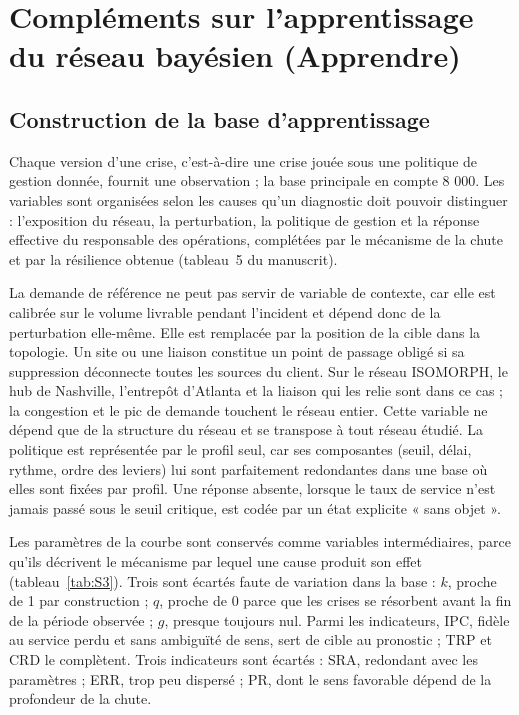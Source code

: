 \section{Compléments sur l'apprentissage du réseau bayésien (Apprendre)}
\label{sec:S5}

\subsection{Construction de la base d'apprentissage}
\label{sec:S5.1}

Chaque version d'une crise, c'est-à-dire une crise jouée sous une politique de gestion donnée, fournit une observation ; la base principale en compte 8 000. Les variables sont organisées selon les causes qu'un diagnostic doit pouvoir distinguer : l'exposition du réseau, la perturbation, la politique de gestion et la réponse effective du responsable des opérations, complétées par le mécanisme de la chute et par la résilience obtenue (tableau~5 du manuscrit).

La demande de référence ne peut pas servir de variable de contexte, car elle est calibrée sur le volume livrable pendant l'incident et dépend donc de la perturbation elle-même. Elle est remplacée par la position de la cible dans la topologie. Un site ou une liaison constitue un point de passage obligé si sa suppression déconnecte toutes les sources du client. Sur le réseau ISOMORPH, le hub de Nashville, l'entrepôt d'Atlanta et la liaison qui les relie sont dans ce cas ; la congestion et le pic de demande touchent le réseau entier. Cette variable ne dépend que de la structure du réseau et se transpose à tout réseau étudié. La politique est représentée par le profil seul, car ses composantes (seuil, délai, rythme, ordre des leviers) lui sont parfaitement redondantes dans une base où elles sont fixées par profil. Une réponse absente, lorsque le taux de service n'est jamais passé sous le seuil critique, est codée par un état explicite « sans objet ».

Les paramètres de la courbe sont conservés comme variables intermédiaires, parce qu'ils décrivent le mécanisme par lequel une cause produit son effet (tableau~\ref{tab:S3}). Trois sont écartés faute de variation dans la base : $k$, proche de 1 par construction ; $q$, proche de 0 parce que les crises se résorbent avant la fin de la période observée ; $g$, presque toujours nul. Parmi les indicateurs, IPC, fidèle au service perdu et sans ambiguïté de sens, sert de cible au pronostic ; TRP et CRD le complètent. Trois indicateurs sont écartés : SRA, redondant avec les paramètres ; ERR, trop peu dispersé ; PR, dont le sens favorable dépend de la profondeur de la chute.

